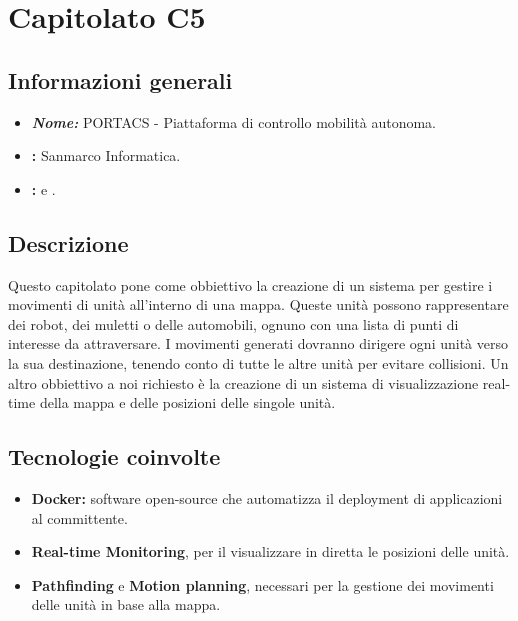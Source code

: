 \section{Capitolato C5}

\subsection{Informazioni generali}
\begin{itemize}
\item \textbf{\emph{Nome:}} PORTACS - Piattaforma di controllo mobilità autonoma.
\item \textbf{\commitProg:} Sanmarco Informatica.
\item \textbf{\proponProg:} \VT{} e \CR.
\end{itemize}

\subsection{Descrizione}
Questo capitolato pone come obbiettivo la creazione di un sistema per gestire i movimenti di unità all'interno di una mappa. Queste unità possono rappresentare dei robot, dei muletti o delle automobili, ognuno con una lista di punti di interesse da attraversare. I movimenti generati dovranno dirigere ogni unità verso la sua destinazione, tenendo conto di tutte le altre unità per evitare collisioni.
Un altro obbiettivo a noi richiesto è la creazione di un sistema di visualizzazione real-time della mappa e delle posizioni delle singole unità.

\subsection{Tecnologie coinvolte}
\begin{itemize}
\item \textbf{Docker:} software open-source che automatizza il deployment di applicazioni al committente.
\item \textbf{Real-time Monitoring}, per il visualizzare in diretta le posizioni delle unità.
\item \textbf{Pathfinding} e \textbf{Motion planning}, necessari per la gestione dei movimenti delle unità in base alla mappa.
\end{itemize}

